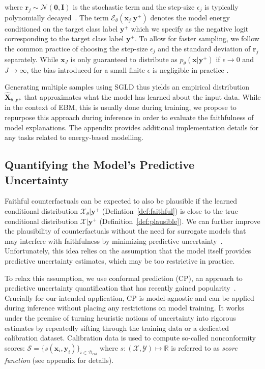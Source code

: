 \documentclass[letterpaper]{article} %
\begin{document}
where $\mathbf{r}_j \sim \mathcal{N}(\mathbf{0},\mathbf{I})$ is the stochastic term and the step-size $\epsilon_j$ is typically polynomially decayed~\citep{welling2011bayesian}. The term $\mathcal{E}_{\theta}(\mathbf{x}_j|\mathbf{y}^+)$ denotes the model energy conditioned on the target class label $\mathbf{y}^+$ which we specify as the negative logit corresponding to the target class label $\mathbf{y}^{+}$. To allow for faster sampling, we follow the common practice of choosing the step-size $\epsilon_j$ and the standard deviation of $\mathbf{r}_j$ separately. While $\mathbf{x}_J$ is only guaranteed to distribute as $p_{\theta}(\mathbf{x}|\mathbf{y}^{+})$ if $\epsilon \rightarrow 0$ and $J \rightarrow \infty$, the bias introduced for a small finite $\epsilon$ is negligible in practice \citep{murphy2023probabilistic}. 

Generating multiple samples using SGLD thus yields an empirical distribution $\widehat{\mathbf{X}}_{\theta,\mathbf{y}^+}$ that approximates what the model has learned about the input data. While in the context of EBM, this is usually done during training, we propose to repurpose this approach during inference in order to evaluate the faithfulness of model explanations. The appendix provides additional implementation details for any tasks related to energy-based modelling. 

\subsection{Quantifying the Model's Predictive Uncertainty}

Faithful counterfactuals can be expected to also be plausible if the learned conditional distribution $\mathcal{X}_{\theta}|\mathbf{y}^+$ (Defintion~\ref{def:faithful}) is close to the true conditional distribution $\mathcal{X}|\mathbf{y}^+$ (Definition~\ref{def:plausible}). We can further improve the plausibility of counterfactuals without the need for surrogate models that may interfere with faithfulness by minimizing predictive uncertainty~\citep{schut2021generating}.
Unfortunately, this idea relies on the assumption that the model itself provides predictive uncertainty estimates, which may be too restrictive in practice. 

To relax this assumption, we use conformal prediction (CP), an approach to predictive uncertainty quantification that has recently gained popularity~\citep{angelopoulos2021gentle,manokhin2022awesome}. Crucially for our intended application, CP is model-agnostic and can be applied during inference without placing any restrictions on model training. It works under the premise of turning heuristic notions of uncertainty into rigorous estimates by repeatedly sifting through the training data or a dedicated calibration dataset. Calibration data is used to compute so-called nonconformity scores: $\mathcal{S}=\{s(\mathbf{x}_i,\mathbf{y}_i)\}_{i \in \mathcal{D}_{\text{cal}}}$ where $s: (\mathcal{X},\mathcal{Y}) \mapsto \mathbb{R}$ is referred to as \textit{score function} (see appendix for details).
\end{document}
